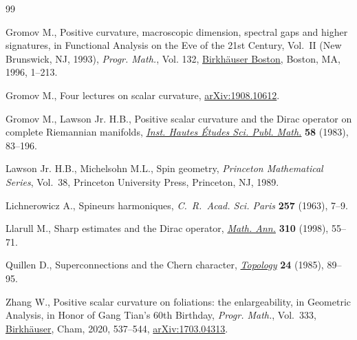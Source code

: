 \documentclass[10pt,a4paper]{amsart}
\numberwithin{equation}{section}
\theoremstyle{definition}
\begin{document}
\begin{thebibliography}{99}
\footnotesize\itemsep=0pt

Gromov M., Positive curvature, macroscopic dimension, spectral gaps and higher
 signatures, in Functional Analysis on the Eve of the 21st Century,
 {V}ol.~{II} ({N}ew {B}runswick, {NJ}, 1993), \textit{Progr. Math.}, Vol. 132,
 \href{https://doi.org/10.1007/s10107-010-0354-x}{Birkh\"{a}user Boston}, Boston, MA, 1996, 1--213.

Gromov M., Four lectures on scalar curvature, \href{https://arxiv.org/abs/1908.10612}{arXiv:1908.10612}.

Gromov M., Lawson Jr. H.B., Positive scalar curvature and the {D}irac operator
 on complete {R}iemannian manifolds, \href{https://doi.org/10.1007/BF02953774}{\textit{Inst. Hautes \'Etudes Sci. Publ. Math.}} \textbf{58} (1983), 83--196.

Lawson Jr. H.B., Michelsohn M.L., Spin geometry, \textit{Princeton Mathematical
 Series}, Vol.~38, Princeton University Press, Princeton, NJ, 1989.

Lichnerowicz A., Spineurs harmoniques, \textit{C.~R.~Acad. Sci. Paris} \textbf{257} (1963), 7--9.

Llarull M., Sharp estimates and the {D}irac operator, \href{https://doi.org/10.1007/s002080050136}{\textit{Math. Ann.}} \textbf{310} (1998), 55--71.

Quillen D., Superconnections and the {C}hern character, \href{https://doi.org/10.1016/0040-9383(85)90047-3}{\textit{Topology}} \textbf{24} (1985), 89--95.

Zhang W., Positive scalar curvature on foliations: the enlargeability, in
 Geometric Analysis, in Honor of Gang Tian's 60th Birthday, \textit{Progr.
 Math.}, Vol.~333, \href{https://doi.org/10.1007/978-3-030-34953-0_22}{Birkh\"auser}, Cham, 2020, 537--544, \href{https://arxiv.org/abs/1703.04313}{arXiv:1703.04313}.

\end{thebibliography}
\end{document}
